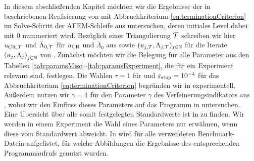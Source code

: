 In diesem abschließenden Kapitel möchten wir die Ergebnisse der in
 beschriebenen Realisierung von
 mit Abbruchkriterium
\eqref{eq:terminationCriterion} im Solve-Schritt der AFEM-Schleife aus
 untersuchen, deren initiales Level dabei mit 0 nummeriert
wird.
Bezüglich einer Triangulierung $\mathcal{T}$ schreiben wir hier $u_{\textup{CR}, \mathcal{T}}$ und
$\bar\Lambda_{0,\mathcal{T}}$ für $u_\textup{CR}$ und $\bar\Lambda_0$ aus
 sowie $(u_{j, \mathcal{T}}, \Lambda_{j,\mathcal{T}})_{j\in\mathbb{N}}$
für die Iterate $\left(u_j, \Lambda_j\right)_{j\in\mathbb{N}}$  von
.
Zunächst möchten wir die Belegung für alle Parameter aus den Tabellen
\ref{tab:paramsMisc}--\ref{tab:paramsExperiment}, die für ein Experiment
relevant sind, festlegen.
Die Wahlen $\tau = 1$ für  und $\varepsilon_{\textup{stop}}
= 10^{-4}$ für das Abbruchkriterium \eqref{eq:terminationCriterion} begründen
wir in  experimentell. 
Außerdem nutzen wir $\gamma = 1$ für den Parameter $\gamma$ des
Verfeinerungsindikators aus , wobei wir den
Einfluss dieses Parameters auf das Programm in
 untersuchen. 
Eine Übersicht über alle somit festgelegten Standardwerte ist in
 zu finden. 
Wir werden in einem Experiment die Wahl eines Parameters nur
erwähnen, wenn diese vom Standardwert abweicht.
In  wird für alle verwendeten Benchmark-Datein
aufgelistet, für welche Abbildungen die Ergebnisse des entsprechenden
Programmaufrufs genutzt wurden.

